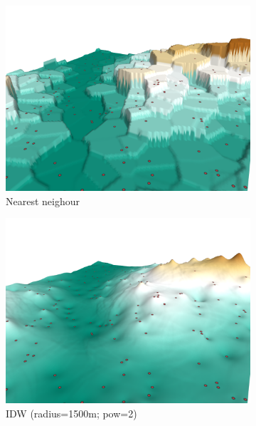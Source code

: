 \begin{figure}
  \centering
  \begin{subfigure}[b]{0.41\linewidth}
    \centering
    \includegraphics{figs/results/nn.png}
    \caption{Nearest neighour}
  \end{subfigure}%
  \quad
  \begin{subfigure}[b]{0.41\linewidth}
    \centering
    \includegraphics{figs/results/idw_r1500_p2.png}
    \caption{IDW (radius=1500m; pow=2)}
  \end{subfigure}
  \quad
  \begin{subfigure}[b]{0.41\linewidth}
    \centering

\end{subfigure}
\end{figure}
